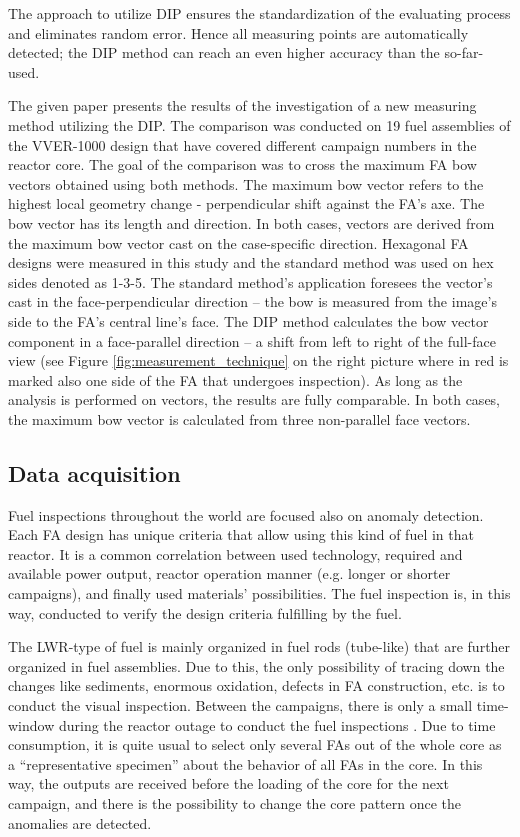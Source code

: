 \documentclass[preprint,12pt]{elsarticle}
\begin{document}
The approach to utilize \ac{DIP} ensures the standardization of the evaluating process and eliminates random error. Hence all measuring points are automatically detected; the \ac{DIP} method can reach an even higher accuracy than the so-far-used. 

The given paper presents the results of the investigation of a new measuring method utilizing the \ac{DIP}. The comparison was conducted on 19 fuel assemblies of the VVER-1000  design that have covered different campaign numbers in the reactor core. The goal of the comparison was to cross the maximum \ac{FA} bow vectors obtained using both methods. The maximum bow vector refers to the highest local geometry change - perpendicular shift against the \ac{FA}'s axe. The bow vector has its length and direction. In both cases, vectors are derived from the maximum bow vector cast on the case-specific direction. Hexagonal \ac{FA} designs were measured in this study and the standard method was used on hex sides denoted as 1-3-5. The standard method's application foresees the vector's cast in the face-perpendicular direction – the bow is measured from the image's side to the \ac{FA}'s central line's face. The \ac{DIP} method calculates the bow vector component in a face-parallel direction – a shift from left to right of the full-face view (see Figure \ref{fig:measurement_technique} on the right picture where in red is marked also one side of the FA that undergoes inspection). As long as the analysis is performed on vectors, the results are fully comparable. In both cases, the maximum bow vector is calculated from three non-parallel face vectors. 

\subsection*{Data acquisition}
Fuel inspections throughout the world are focused also on anomaly detection. Each \ac{FA} design has unique criteria that allow using this kind of fuel in that reactor. It is a common correlation between used technology, required and available power output, reactor operation manner (e.g. longer or shorter campaigns), and finally used materials’ possibilities. The fuel inspection is, in this way, conducted to verify the design criteria fulfilling by the fuel.

The \ac{LWR}-type of fuel is mainly organized in fuel rods (tube-like) that are further organized in fuel assemblies. Due to this, the only possibility of tracing down the changes like sediments, enormous oxidation, defects in \ac{FA} construction, etc. is to conduct the visual inspection. Between the campaigns, there is only a small time-window during the reactor outage to conduct the fuel inspections \cite{Gabrielsson2018}. Due to time consumption, it is quite usual to select only several \ac{FA}s out of the whole core as a “representative specimen” about the behavior of all \ac{FA}s in the core. In this way, the outputs are received before the loading of the core for the next campaign, and there is the possibility to change the core pattern once the anomalies are detected.
\end{document}
